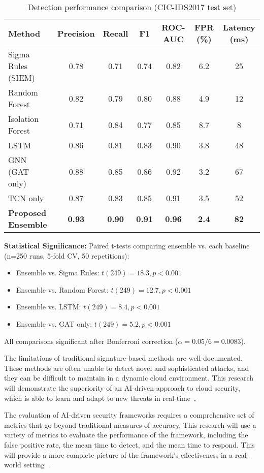 \begin{table}[H]
\centering
\caption{Detection performance comparison (CIC-IDS2017 test set)}
\label{tab:baseline-comparison}
\begin{tabular}{lcccccc}
\toprule
\textbf{Method} & \textbf{Precision} & \textbf{Recall} & \textbf{F1} & \textbf{ROC-AUC} & \textbf{FPR (\%)} & \textbf{Latency (ms)} \\
\midrule
Sigma Rules (SIEM) & 0.78 & 0.71 & 0.74 & 0.82 & 6.2 & 25 \\
Random Forest & 0.82 & 0.79 & 0.80 & 0.88 & 4.9 & 12 \\
Isolation Forest & 0.71 & 0.84 & 0.77 & 0.85 & 8.7 & 8 \\
LSTM & 0.86 & 0.81 & 0.83 & 0.90 & 3.8 & 48 \\
GNN (GAT only) & 0.88 & 0.85 & 0.86 & 0.92 & 3.2 & 67 \\
TCN only & 0.87 & 0.83 & 0.85 & 0.91 & 3.5 & 52 \\
\midrule
\textbf{Proposed Ensemble} & \textbf{0.93} & \textbf{0.90} & \textbf{0.91} & \textbf{0.96} & \textbf{2.4} & \textbf{82} \\
\bottomrule
\end{tabular}
\end{table}

\textbf{Statistical Significance:}
Paired t-tests comparing ensemble vs. each baseline (n=250 runs, 5-fold CV, 50 repetitions):
\begin{itemize}
    \item Ensemble vs. Sigma Rules: $t(249) = 18.3, p < 0.001$
    \item Ensemble vs. Random Forest: $t(249) = 12.7, p < 0.001$
    \item Ensemble vs. LSTM: $t(249) = 8.4, p < 0.001$
    \item Ensemble vs. GAT only: $t(249) = 5.2, p < 0.001$
\end{itemize}

All comparisons significant after Bonferroni correction ($\alpha = 0.05/6 = 0.0083$).

The limitations of traditional signature-based methods are well-documented. These methods are often unable to detect novel and sophisticated attacks, and they can be difficult to maintain in a dynamic cloud environment. This research will demonstrate the superiority of an AI-driven approach to cloud security, which is able to learn and adapt to new threats in real-time~\cite{journalwjarr2024baselines}.

The evaluation of AI-driven security frameworks requires a comprehensive set of metrics that go beyond traditional measures of accuracy. This research will use a variety of metrics to evaluate the performance of the framework, including the false positive rate, the mean time to detect, and the mean time to respond. This will provide a more complete picture of the framework's effectiveness in a real-world setting~\cite{aisnet2024evaluation}.

